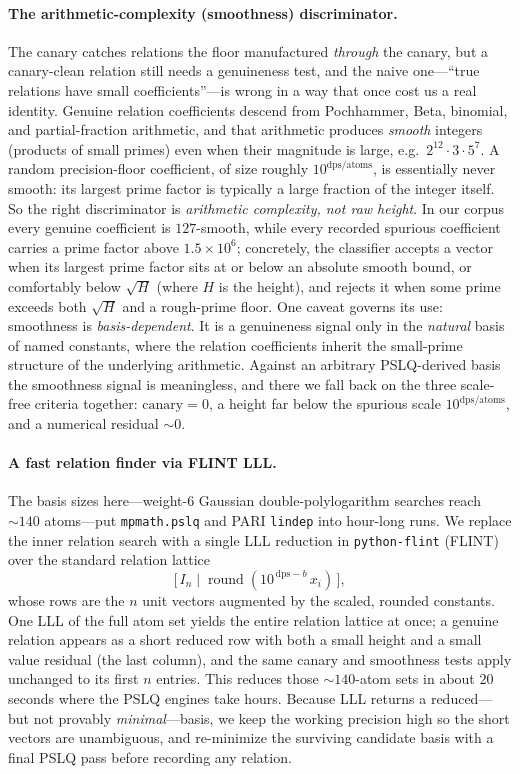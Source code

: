 \documentclass[11pt]{article}
\theoremstyle{plain}
\theoremstyle{remark}
\begin{document}
\paragraph{The arithmetic-complexity (smoothness) discriminator.}
The canary catches relations the floor manufactured \emph{through} the canary, but a canary-clean relation still needs a genuineness test, and the naive one---``true relations have small coefficients''---is wrong in a way that once cost us a real identity. Genuine relation coefficients descend from Pochhammer, Beta, binomial, and partial-fraction arithmetic, and that arithmetic produces \emph{smooth} integers (products of small primes) even when their magnitude is large, e.g.\ $2^{12}\cdot 3\cdot 5^{7}$. A random precision-floor coefficient, of size roughly $10^{\text{dps}/\text{atoms}}$, is essentially never smooth: its largest prime factor is typically a large fraction of the integer itself. So the right discriminator is \emph{arithmetic complexity, not raw height}. In our corpus every genuine coefficient is $127$-smooth, while every recorded spurious coefficient carries a prime factor above $1.5\times10^{6}$; concretely, the classifier accepts a vector when its largest prime factor sits at or below an absolute smooth bound, or comfortably below $\sqrt{H}$ (where $H$ is the height), and rejects it when some prime exceeds both $\sqrt{H}$ and a rough-prime floor. One caveat governs its use: smoothness is \emph{basis-dependent}. It is a genuineness signal only in the \emph{natural} basis of named constants, where the relation coefficients inherit the small-prime structure of the underlying arithmetic. Against an arbitrary PSLQ-derived basis the smoothness signal is meaningless, and there we fall back on the three scale-free criteria together: $\text{canary}=0$, a height far below the spurious scale $10^{\text{dps}/\text{atoms}}$, and a numerical residual $\sim 0$.

\paragraph{A fast relation finder via FLINT LLL.}
The basis sizes here---weight-$6$ Gaussian double-polylogarithm searches reach $\sim 140$ atoms---put \texttt{mpmath.pslq} and PARI \texttt{lindep} into hour-long runs. We replace the inner relation search with a single LLL reduction in \texttt{python-flint} (FLINT) over the standard relation lattice
\[
  \bigl[\, I_n \;\big|\; \operatorname{round}(10^{\,\text{dps}-b}\, x_i)\,\bigr],
\]
whose rows are the $n$ unit vectors augmented by the scaled, rounded constants. One LLL of the full atom set yields the entire relation lattice at once; a genuine relation appears as a short reduced row with both a small height and a small value residual (the last column), and the same canary and smoothness tests apply unchanged to its first $n$ entries. This reduces those $\sim 140$-atom sets in about $20$ seconds where the PSLQ engines take hours. Because LLL returns a reduced---but not provably \emph{minimal}---basis, we keep the working precision high so the short vectors are unambiguous, and re-minimize the surviving candidate basis with a final PSLQ pass before recording any relation.
\end{document}
